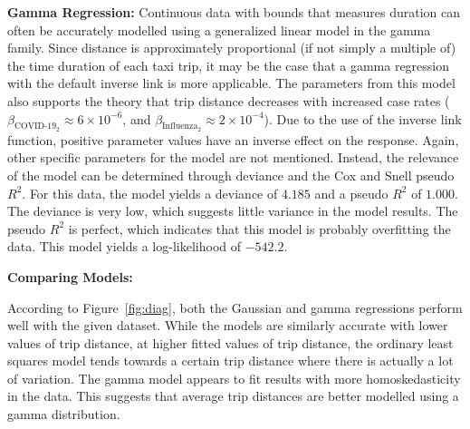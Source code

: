 \documentclass[11pt]{article}
\begin{document}
\textbf{Gamma Regression:}
Continuous data with bounds that measures duration can often be accurately modelled using a generalized linear model in the gamma family.
Since distance is approximately proportional (if not simply a multiple of) the time duration of each taxi trip,
it may be the case that a gamma regression with the default inverse link is more applicable.
The parameters from this model also supports the theory that trip distance decreases with increased case rates
($\beta_{\text{COVID-19}_2} \approx 6 \times 10^{-6}$, and $\beta_{\text{Influenza}_2} \approx 2 \times 10^{-4}$).
Due to the use of the inverse link function, positive parameter values have an inverse effect on the response.
Again, other specific parameters for the model are not mentioned.
Instead, the relevance of the model can be determined through deviance and the Cox and Snell pseudo $R^2$.
For this data, the model yields a deviance of $4.185$ and a pseudo $R^2$ of $1.000$.
The deviance is very low, which suggests little variance in the model results.
The pseudo $R^2$ is perfect, which indicates that this model is probably overfitting the data.
This model yields a log-likelihood of $-542.2$.

\textbf{Comparing Models:}

According to Figure~\ref{fig:diag}, both the Gaussian and gamma regressions perform well with the given dataset.
While the models are similarly accurate with lower values of trip distance, 
at higher fitted values of trip distance, the ordinary least squares model tends towards a certain trip distance where there is actually a lot of variation.
The gamma model appears to fit results with more homoskedasticity in the data.
This suggests that average trip distances are better modelled using a gamma distribution.
\end{document}
